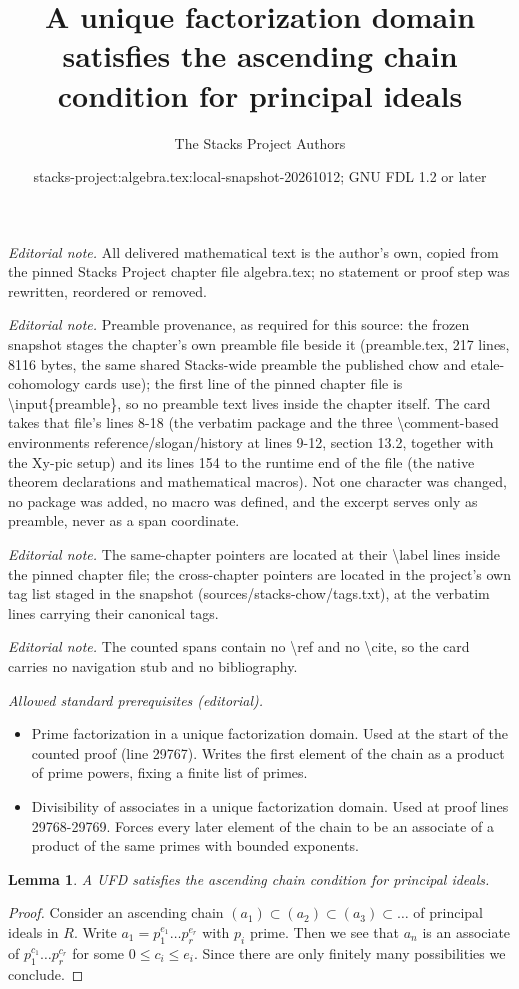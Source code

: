 \documentclass[10pt,a4paper]{amsart}
\title{A unique factorization domain satisfies the ascending chain condition for principal ideals}
\author{The Stacks Project Authors}
\date{stacks-project:algebra.tex:local-snapshot-20261012; GNU FDL 1.2 or later}
\theoremstyle{plain}
\newtheorem{lemma}[subsection]{Lemma}
\theoremstyle{definition}
\theoremstyle{remark}
\numberwithin{equation}{subsection}
\begin{document}
\maketitle
\noindent\textit{Editorial note.} All delivered mathematical text is the author's own, copied from the pinned Stacks Project chapter file algebra.tex; no statement or proof step was rewritten, reordered or removed.\par\medskip
\noindent\textit{Editorial note.} Preamble provenance, as required for this source: the frozen snapshot stages the chapter's own preamble file beside it (preamble.tex, 217 lines, 8116 bytes, the same shared Stacks-wide preamble the published chow and etale-cohomology cards use); the first line of the pinned chapter file is \textbackslash{}input\{preamble\}, so no preamble text lives inside the chapter itself. The card takes that file's lines 8-18 (the verbatim package and the three \textbackslash{}comment-based environments reference/slogan/history at lines 9-12, section 13.2, together with the Xy-pic setup) and its lines 154 to the runtime end of the file (the native theorem declarations and mathematical macros). Not one character was changed, no package was added, no macro was defined, and the excerpt serves only as preamble, never as a span coordinate.\par\medskip
\noindent\textit{Editorial note.} The same-chapter pointers are located at their \textbackslash{}label lines inside the pinned chapter file; the cross-chapter pointers are located in the project's own tag list staged in the snapshot (sources/stacks-chow/tags.txt), at the verbatim lines carrying their canonical tags.\par\medskip
\noindent\textit{Editorial note.} The counted spans contain no \textbackslash{}ref and no \textbackslash{}cite, so the card carries no navigation stub and no bibliography.\par\medskip
\noindent\textit{Allowed standard prerequisites (editorial).}\begin{itemize}
\item Prime factorization in a unique factorization domain. Used at the start of the counted proof (line 29767). Writes the first element of the chain as a product of prime powers, fixing a finite list of primes.
\item Divisibility of associates in a unique factorization domain. Used at proof lines 29768-29769. Forces every later element of the chain to be an associate of a product of the same primes with bounded exponents.
\end{itemize}\medskip
\begin{lemma}
\label{lemma-UFD-ascending-chain-condition-principal-ideals}
A UFD satisfies the ascending chain condition for principal
ideals.
\end{lemma}

\begin{proof}
Consider an ascending chain $(a_1) \subset (a_2) \subset (a_3) \subset \ldots$
of principal ideals in $R$. Write $a_1 = p_1^{e_1} \ldots p_r^{e_r}$
with $p_i$ prime. Then we see that $a_n$ is an associate of
$p_1^{c_1} \ldots p_r^{c_r}$ for some $0 \leq c_i \leq e_i$.
Since there are only finitely many possibilities we conclude.
\end{proof}
\end{document}
